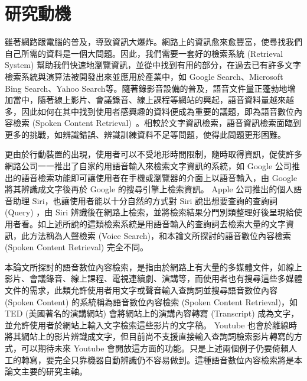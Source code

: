 \section{研究動機}
雖著網路跟電腦的普及，導致資訊大爆炸。網路上的資訊愈來愈豐富，使尋找我們自己所需的資料是一個大問題。因此，我們需要一套好的檢索系統
(Retrieval System) 幫助我們快速地瀏覽資訊，並從中找到有用的部分，在過去已有許多文字檢索系統與演算法被開發出來並應用於產業中，如 Google Search、Microsoft Bing Search、Yahoo
Search等。隨著錄影音設備的普及，語音文件量正蓬勃地增加當中，隨著線上影片、會議錄音、線上課程等網站的興起，語音資料量越來越多，因此如何在其中找到使用者感興趣的資料便成為重要的議題，即為語音數位內容檢索 (Spoken Content Retrieval)~\cite{chelba2008retrieval, lee2005spoken}。相較於文字資訊檢索，語音資訊檢索面臨到更多的挑戰，如辨識錯誤、辨識訓練資料不足等問題，使得此問題更形困難。

更由於行動裝置的出現，使用者可以不受地形時間限制，隨時取得資訊，促使許多網路公司一一推出了自家的用語音輸入來檢索文字資訊的系統，如 Google 公司推出的語音檢索功能即可讓使用者在手機或瀏覽器的介面上以語音輸入，由 Google 將其辨識成文字後再於 Google 的搜尋引擎上檢索資訊。 Apple 公司推出的個人語音助理 Siri，也讓使用者能以十分自然的方式對 Siri 說出想要查詢的查詢詞 (Query) ，由 Siri 辨識後在網路上檢索，並將檢索結果分門別類整理好後呈現給使用者看。如上述所說的這類檢索系統是用語音輸入的查詢詞去檢索大量的文字資訊，此方法稱為人聲檢索 (Voice Search)，和本論文所探討的語音數位內容檢索 (Spoken Content Retrieval) 完全不同。

本論文所探討的語音數位內容檢索，是指由於網路上有大量的多媒體文件，如線上影片、會議錄音、線上課程、電視連續劇、演講等，而使用者也有搜尋這些多媒體文件的需求，此類允許使用者用文字或聲音輸入查詢詞並搜尋語音數位內容 (Spoken Content) 的系統稱為語音數位內容檢索 (Spoken Content Retrieval)，如 TED (美國著名的演講網站) 會將網站上的演講內容轉寫 (Transcript) 成為文字，並允許使用者於網站上輸入文字檢索這些影片的文字稿。 Youtube 也會於離線時將其網站上的影片辨識成文字，但目前尚不支援直接輸入查詢詞檢索影片轉寫的方式，可以期待未來 Youtube 會開放這方面的功能。只是上述兩個例子仍要倚賴人工的轉寫，要完全只靠機器自動辨識仍不容易做到。這種語音數位內容檢索將是本論文主要的研究主軸。


